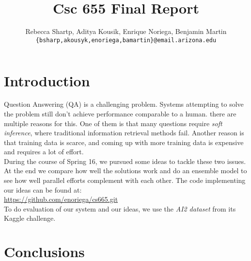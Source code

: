 \documentclass[11pt]{article}
\title{Csc 655 Final Report}
\author{Rebecca Shartp, Aditya Kousik, Enrique Noriega, Benjamin Martin\\
  {\tt \{bsharp,akousyk,enoriega,bamartin\}@email.arizona.edu} \\}
\date{}
\begin{document}
\maketitle
\begin{abstract}
  
\end{abstract}

\section{Introduction}

Question Answering (QA) is a challenging problem. Systems attempting to solve the problem still don't achieve performance comparable to a human. there are multiple reasons for this. One of them is that many questions require \emph{soft inference}, where traditional information retrieval methods fail. Another reason is that training data is scarce, and coming up with more training data is expensive and requires a lot of effort. \\

During the course of Spring 16, we pursued some ideas to tackle these two issues. At the end we compare how well the solutions work and do an ensemble model to see how well parallel efforts complement with each other. The code implementing our ideas can be found at:\\ 
\url{https://github.com/enoriega/cs665.git}\\

To do evaluation of our system and our ideas, we use the \emph{AI2 dataset} from its Kaggle challenge.








\section{Conclusions}

%
%
\end{document}

